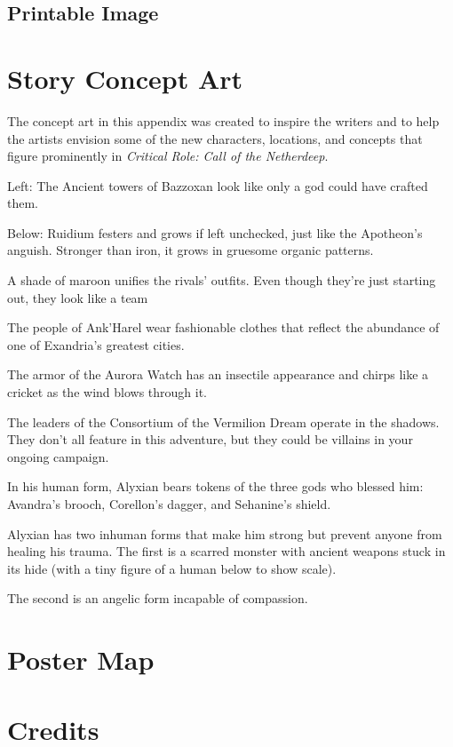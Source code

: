 \documentclass[10pt,a4paper,twoside,fancy,bg=print,twocolumn,openany,nodeprecatedcode]{dndbook}
\begin{document}
\section{Printable Image}
\chapter{Story Concept Art}
The concept art in this appendix was created to inspire the writers and to help the artists envision some of the new characters, locations, and concepts that figure prominently in \textit{Critical Role: Call of the Netherdeep}.

Left: The Ancient towers of Bazzoxan look like only a god could have crafted them.

Below: Ruidium festers and grows if left unchecked, just like the Apotheon's anguish. Stronger than iron, it grows in gruesome organic patterns.

A shade of maroon unifies the rivals' outfits. Even though they're just starting out, they look like a team

The people of Ank'Harel wear fashionable clothes that reflect the abundance of one of Exandria's greatest cities.

The armor of the Aurora Watch has an insectile appearance and chirps like a cricket as the wind blows through it.

The leaders of the Consortium of the Vermilion Dream operate in the shadows. They don't all feature in this adventure, but they could be villains in your ongoing campaign.

In his human form, Alyxian bears tokens of the three gods who blessed him: Avandra's brooch, Corellon's dagger, and Sehanine's shield.

Alyxian has two inhuman forms that make him strong but prevent anyone from healing his trauma. The first is a scarred monster with ancient weapons stuck in its hide (with a tiny figure of a human below to show scale).

The second is an angelic form incapable of compassion.

\chapter{Poster Map}
\chapter{Credits}
\end{document}
